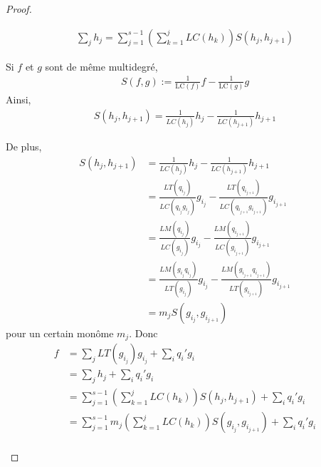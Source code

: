 \begin{proof}
\begin{enumerate}
                    \begin{align*}
                        \sum_j h_j = \sum_{j = 1}^{s-1} \left(\sum_{k = 1}^j LC(h_k) \right) S(h_j,h_{j+1})
                    \end{align*}
                    \begin{remq}
                        Si $f$ et $g$ sont de même multidegré,
                        \begin{align*}
                            S(f,g) := \frac{1}{\mathrm{LC}(f)}f - \frac{1}{\mathrm{LC}(g)}g
                        \end{align*}
                        Ainsi,
                        \begin{align*}
                            S(h_j, h_{j+1}) = \frac{1}{LC(h_j)}h_j - \frac{1}{LC(h_{j+1})}h_{j+1}
                        \end{align*}
                    \end{remq}
                    De plus,
                    \begin{align*}
                        S(h_j, h_{j+1}) &= \frac{1}{LC(h_j)}h_j - \frac{1}{LC(h_{j+1})}h_{j+1} \\
                        &= \frac{LT(q_{i_j})}{LC(q_{i_j}g_{i_j})}g_{i_j} - \frac{LT(q_{i_{j+1}})}{LC(q_{i_{j+1}}g_{i_{j+1}})}g_{i_{j+1}} \\
                        &= \frac{LM(q_{i_j})}{LC(g_{i_j})}g_{i_j} - \frac{LM(q_{i_{j+1}})}{LC(g_{i_{j+1}})}g_{i_{j+1}} \\
                        &= \frac{LM(g_{i_j}q_{i_j})}{LT(g_{i_j})}g_{i_j} - \frac{LM(g_{i_{j+1}}q_{i_{j+1}})}{LT(g_{i_{j+1}})}g_{i_{j+1}} \\
                        &= m_j S(g_{i_j}, g_{i_{j+1}})
                    \end{align*}
                    pour un certain monôme $m_j$. Donc
                    \begin{align*}
                        f &= \sum_j LT(g_{i_j})g_{i_j} + \sum_i q_i'g_i \\
                        &= \sum_j h_j + \sum_i q_i'g_i \\
                        &= \sum_{j = 1}^{s-1} \left(\sum_{k = 1}^j LC(h_k) \right) S(h_j,h_{j+1}) + \sum_i q_i'g_i \\
                        &= \sum_{j = 1}^{s-1} m_j \left(\sum_{k = 1}^j LC(h_k) \right) S(g_{i_j},g_{i_{j+1}}) + \sum_i q_i'g_i \\
                    \end{align*}

\end{enumerate}
\end{proof}
